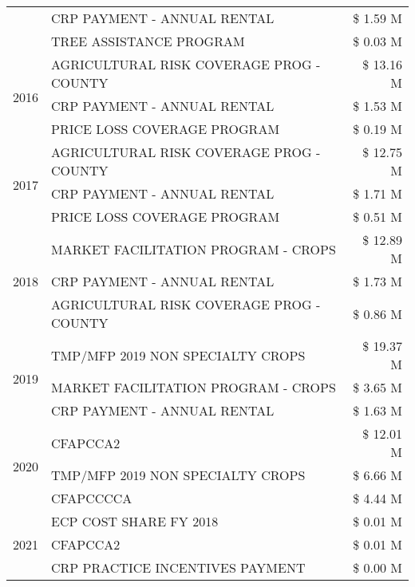 \begin{tabular}{llr}
 & CRP PAYMENT - ANNUAL RENTAL & \$ 1.59 M \\
 & TREE ASSISTANCE PROGRAM & \$ 0.03 M \\
\cline{1-3}
\multirow[t]{3}{*}{2016} & AGRICULTURAL RISK COVERAGE PROG - COUNTY & \$ 13.16 M \\
 & CRP PAYMENT - ANNUAL RENTAL & \$ 1.53 M \\
 & PRICE LOSS COVERAGE PROGRAM & \$ 0.19 M \\
\cline{1-3}
\multirow[t]{3}{*}{2017} & AGRICULTURAL RISK COVERAGE PROG - COUNTY & \$ 12.75 M \\
 & CRP PAYMENT - ANNUAL RENTAL & \$ 1.71 M \\
 & PRICE LOSS COVERAGE PROGRAM & \$ 0.51 M \\
\cline{1-3}
\multirow[t]{3}{*}{2018} & MARKET FACILITATION PROGRAM - CROPS & \$ 12.89 M \\
 & CRP PAYMENT - ANNUAL RENTAL & \$ 1.73 M \\
 & AGRICULTURAL RISK COVERAGE PROG - COUNTY & \$ 0.86 M \\
\cline{1-3}
\multirow[t]{3}{*}{2019} & TMP/MFP 2019 NON SPECIALTY CROPS & \$ 19.37 M \\
 & MARKET FACILITATION PROGRAM - CROPS & \$ 3.65 M \\
 & CRP PAYMENT - ANNUAL RENTAL & \$ 1.63 M \\
\cline{1-3}
\multirow[t]{3}{*}{2020} & CFAPCCA2 & \$ 12.01 M \\
 & TMP/MFP 2019 NON SPECIALTY CROPS & \$ 6.66 M \\
 & CFAPCCCCA & \$ 4.44 M \\
\cline{1-3}
\multirow[t]{3}{*}{2021} & ECP COST SHARE FY 2018 & \$ 0.01 M \\
 & CFAPCCA2 & \$ 0.01 M \\
 & CRP PRACTICE INCENTIVES PAYMENT & \$ 0.00 M \\
\cline{1-3}
\bottomrule
\end{tabular}
